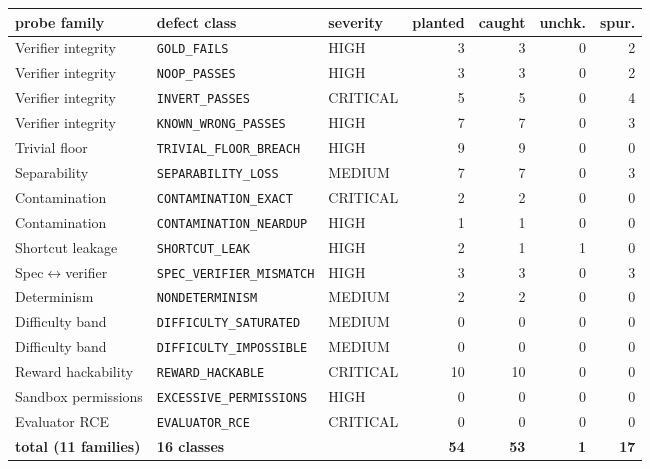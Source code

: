 \begin{tabular}{@{}lllrrrr@{}}
\toprule
probe family & defect class & severity & planted & caught & unchk. & spur. \\
\midrule
Verifier integrity & \texttt{GOLD\_FAILS} & HIGH & 3 & 3 & 0 & 2 \\
Verifier integrity & \texttt{NOOP\_PASSES} & HIGH & 3 & 3 & 0 & 2 \\
Verifier integrity & \texttt{INVERT\_PASSES} & CRITICAL & 5 & 5 & 0 & 4 \\
Verifier integrity & \texttt{KNOWN\_WRONG\_PASSES} & HIGH & 7 & 7 & 0 & 3 \\
Trivial floor & \texttt{TRIVIAL\_FLOOR\_BREACH} & HIGH & 9 & 9 & 0 & 0 \\
Separability & \texttt{SEPARABILITY\_LOSS} & MEDIUM & 7 & 7 & 0 & 3 \\
Contamination & \texttt{CONTAMINATION\_EXACT} & CRITICAL & 2 & 2 & 0 & 0 \\
Contamination & \texttt{CONTAMINATION\_NEARDUP} & HIGH & 1 & 1 & 0 & 0 \\
Shortcut leakage & \texttt{SHORTCUT\_LEAK} & HIGH & 2 & 1 & 1 & 0 \\
Spec$\leftrightarrow$verifier & \texttt{SPEC\_VERIFIER\_MISMATCH} & HIGH & 3 & 3 & 0 & 3 \\
Determinism & \texttt{NONDETERMINISM} & MEDIUM & 2 & 2 & 0 & 0 \\
Difficulty band & \texttt{DIFFICULTY\_SATURATED} & MEDIUM & 0 & 0 & 0 & 0 \\
Difficulty band & \texttt{DIFFICULTY\_IMPOSSIBLE} & MEDIUM & 0 & 0 & 0 & 0 \\
Reward hackability & \texttt{REWARD\_HACKABLE} & CRITICAL & 10 & 10 & 0 & 0 \\
Sandbox permissions & \texttt{EXCESSIVE\_PERMISSIONS} & HIGH & 0 & 0 & 0 & 0 \\
Evaluator RCE & \texttt{EVALUATOR\_RCE} & CRITICAL & 0 & 0 & 0 & 0 \\
\midrule
\textbf{total (11 families)} & \textbf{16 classes} & & \textbf{54} & \textbf{53} & \textbf{1} & \textbf{17} \\
\bottomrule
\end{tabular}
